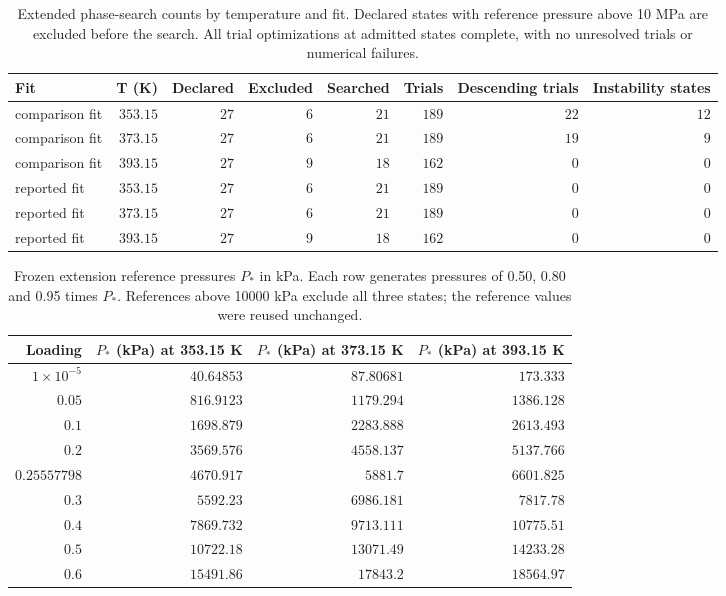 \begin{table}[!htbp]\small\setlength{\tabcolsep}{3pt}\centering
\caption{Extended phase-search counts by temperature and fit. Declared states with reference pressure above 10 MPa are excluded before the search. All trial optimizations at admitted states complete, with no unresolved trials or numerical failures.}\label{tab:phase-extension}
\begin{tabular}{@{}lrrrrrrr@{}}
\toprule
Fit & T (K) & Declared & Excluded & Searched & Trials & Descending trials & Instability states \\
\midrule
comparison fit & $353.15$ & $27$ & $6$ & $21$ & $189$ & $22$ & $12$ \\
comparison fit & $373.15$ & $27$ & $6$ & $21$ & $189$ & $19$ & $9$ \\
comparison fit & $393.15$ & $27$ & $9$ & $18$ & $162$ & $0$ & $0$ \\
reported fit & $353.15$ & $27$ & $6$ & $21$ & $189$ & $0$ & $0$ \\
reported fit & $373.15$ & $27$ & $6$ & $21$ & $189$ & $0$ & $0$ \\
reported fit & $393.15$ & $27$ & $9$ & $18$ & $162$ & $0$ & $0$ \\
\bottomrule
\end{tabular}
\end{table}
\begin{table}[!htbp]\small\setlength{\tabcolsep}{3pt}\centering
\caption{Frozen extension reference pressures $P_*$ in kPa. Each row generates pressures of 0.50, 0.80 and 0.95 times $P_*$. References above 10000 kPa exclude all three states; the reference values were reused unchanged.}\label{tab:phase-extension-references}
\begin{tabular}{@{}rrrr@{}}
\toprule
Loading & \makecell[rb]{$P_*$ (kPa)\\at 353.15 K} & \makecell[rb]{$P_*$ (kPa)\\at 373.15 K} & \makecell[rb]{$P_*$ (kPa)\\at 393.15 K} \\
\midrule
$1\times10^{-5}$ & $40.64853$ & $87.80681$ & $173.333$ \\
$0.05$ & $816.9123$ & $1179.294$ & $1386.128$ \\
$0.1$ & $1698.879$ & $2283.888$ & $2613.493$ \\
$0.2$ & $3569.576$ & $4558.137$ & $5137.766$ \\
$0.25557798$ & $4670.917$ & $5881.7$ & $6601.825$ \\
$0.3$ & $5592.23$ & $6986.181$ & $7817.78$ \\
$0.4$ & $7869.732$ & $9713.111$ & $10775.51$ \\
$0.5$ & $10722.18$ & $13071.49$ & $14233.28$ \\
$0.6$ & $15491.86$ & $17843.2$ & $18564.97$ \\
\bottomrule
\end{tabular}
\end{table}
